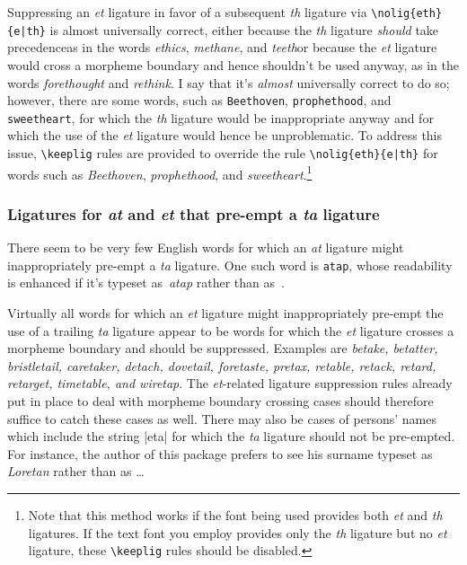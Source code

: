 \documentclass[11pt]{article}
\newcommand{\opt}[1]{\texttt{#1}}
\newcommand{\cmmd}[1]{\texttt{\textbackslash #1}}
\begin{document}
Suppressing an \emph{et} ligature in favor of a subsequent \emph{th} ligature via \Verb+\nolig{eth}{e|th}+ is almost universally correct, either because the \emph{th} ligature \emph{should} take precedence\textemdash as in the words \emph{ethics}, \emph{methane}, and \emph{teeth}\textemdash or because the \emph{et} ligature would cross a morpheme boundary and hence shouldn't be used anyway, as in the words \emph{forethought} and \emph{rethink}. 
I say that it's \emph{almost} universally correct to do so; however, there are some words, such as \opt{Beethoven}, \opt{prophethood}, and \opt{sweetheart}, for which the \emph{th} ligature would be inappropriate anyway and for which the use of the \emph{et} ligature would hence be unproblematic. To address this issue, \cmmd{keeplig} rules are provided to override the rule \Verb+\nolig{eth}{e|th}+ for words such as \emph{Beethoven}, \emph{prophethood}, and \emph{sweetheart}.\footnote{Note that this method works if the font being used provides both \emph{et} and \emph{th} ligatures. If the text font you employ provides only the \emph{th} ligature but no \emph{et} ligature, these \cmmd{keeplig} rules should be disabled.}


\subsubsection*{Ligatures for \emph{at} and \emph{et} that pre-empt a \emph{ta} ligature}

There seem to be very few English words for which an \emph{at} ligature might inappropriately pre-empt a \emph{ta} ligature. One such word is \opt{atap}, whose readability is enhanced if it's typeset as~\emph{atap} rather than as~\emph{}.

Virtually all words for which an \emph{et} ligature might inappropriately pre-empt the use of a trailing \emph{ta} ligature appear to be words for which the \emph{et} ligature crosses a morpheme boundary and should be suppressed. Examples are \emph{betake, betatter, bristletail, caretaker, detach, dovetail, foretaste, pretax, retable, retack, retard, retarget, timetable, \emph{and} wiretap}. The \emph{et}-related ligature suppression rules already put in place to deal with morpheme boundary crossing cases should therefore suffice to catch these cases as well. There may also be cases of persons' names which include the string |eta| for which the \emph{ta} ligature should not be pre-empted. For instance, the author of this package prefers to see his surname typeset as \emph{Loretan} rather than as \emph{}\dots
\end{document}
